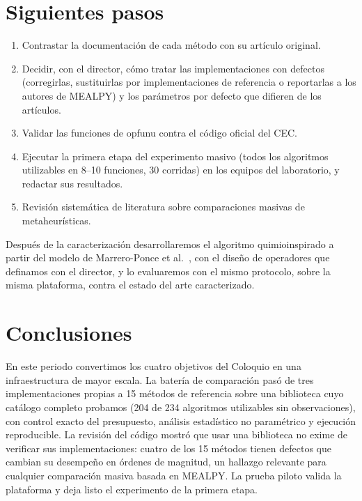 \documentclass[11pt,letterpaper]{article}
\begin{document}
\section{Siguientes pasos}

\begin{enumerate}
  \item Contrastar la documentación de cada método con su artículo original.
  \item Decidir, con el director, cómo tratar las implementaciones con defectos (corregirlas, sustituirlas por implementaciones de referencia o reportarlas a los autores de MEALPY) y los parámetros por defecto que difieren de los artículos.
  \item Validar las funciones de opfunu contra el código oficial del CEC.
  \item Ejecutar la primera etapa del experimento masivo (todos los algoritmos utilizables en 8--10 funciones, 30 corridas) en los equipos del laboratorio, y redactar sus resultados.
  \item Revisión sistemática de literatura sobre comparaciones masivas de metaheurísticas.
\end{enumerate}

Después de la caracterización desarrollaremos el algoritmo quimioinspirado a partir del modelo de Marrero-Ponce et al.~\cite{marrero2021}, con el diseño de operadores que definamos con el director, y lo evaluaremos con el mismo protocolo, sobre la misma plataforma, contra el estado del arte caracterizado.

\section{Conclusiones}

En este periodo convertimos los cuatro objetivos del Coloquio en una infraestructura de mayor escala. La batería de comparación pasó de tres implementaciones propias a 15 métodos de referencia sobre una biblioteca cuyo catálogo completo probamos (204 de 234 algoritmos utilizables sin observaciones), con control exacto del presupuesto, análisis estadístico no paramétrico y ejecución reproducible. La revisión del código mostró que usar una biblioteca no exime de verificar sus implementaciones: cuatro de los 15 métodos tienen defectos que cambian su desempeño en órdenes de magnitud, un hallazgo relevante para cualquier comparación masiva basada en MEALPY. La prueba piloto valida la plataforma y deja listo el experimento de la primera etapa.
\end{document}
